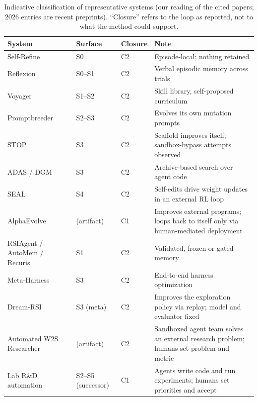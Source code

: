 \documentclass[11pt,a4paper]{article}
\begin{document}
\begin{table}[t]
\centering\small
\caption{Indicative classification of representative systems (our reading of the cited papers; 2026 entries are recent preprints). ``Closure'' refers to the loop as reported, not to what the method could support.}
\label{tab:systems}
\begin{tabularx}{\linewidth}{@{}P{3.4cm}P{1.9cm}P{1.1cm}L@{}}
\toprule
System & Surface & Closure & Note\\
\midrule
Self-Refine~\cite{madaan2023} & S0 & C2 & Episode-local; nothing retained\\
Reflexion~\cite{shinn2023} & S0--S1 & C2 & Verbal episodic memory across trials\\
Voyager~\cite{wang2023voyager} & S1--S2 & C2 & Skill library, self-proposed curriculum\\
Promptbreeder~\cite{fernando2023promptbreeder} & S2--S3 & C2 & Evolves its own mutation prompts\\
STOP~\cite{zelikman2023stop} & S3 & C2 & Scaffold improves itself; sandbox-bypass attempts observed\\
ADAS / DGM~\cite{hu2024adas,zhang2025dgm} & S3 & C2 & Archive-based search over agent code\\
SEAL~\cite{zweiger2025seal} & S4 & C2 & Self-edits drive weight updates in an external RL loop\\
AlphaEvolve~\cite{alphaevolve2025} & (artifact) & C1 & Improves external programs; loops back to itself only via human-mediated deployment\\
RSIAgent / AutoMem / Recuris~\cite{zhu2026rsiagent,du2026automem,yu2026recuris} & S1 & C2 & Validated, frozen or gated memory\\
Meta-Harness~\cite{lee2026metaharness} & S3 & C2 & End-to-end harness optimization\\
Dream-RSI~\cite{zheng2026dreamrsi} & S3 (meta) & C2 & Improves the exploration policy via replay; model and evaluator fixed\\
Automated W2S Researcher~\cite{wen2026aar} & (artifact) & C2 & Sandboxed agent team solves an external research problem; humans set problem and metric\\
Lab R\&D automation~\cite{anthropic2026rsi,openai2026accel} & S2--S5 (successor) & C1 & Agents write code and run experiments; humans set priorities and accept\\
\bottomrule
\end{tabularx}
\end{table}
\end{document}
